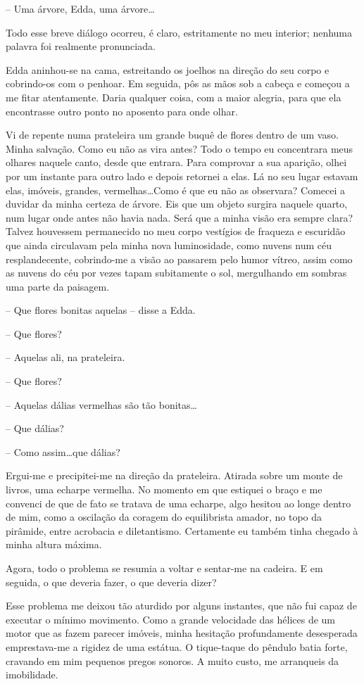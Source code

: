 -- Uma árvore, Edda, uma árvore\dots

Todo esse breve diálogo ocorreu, é claro, estritamente no meu interior; nenhuma palavra foi realmente pronunciada.

Edda aninhou-se na cama, estreitando os joelhos na direção do seu corpo e cobrindo-os com o penhoar. Em seguida, pôs as mãos sob a cabeça e começou a me fitar atentamente. Daria qualquer coisa, com a maior alegria, para que ela encontrasse outro ponto no aposento para onde olhar.

Vi de repente numa prateleira um grande buquê de flores dentro de um vaso. Minha salvação.
Como eu não as vira antes? Todo o tempo eu concentrara meus olhares naquele canto, desde que entrara. Para comprovar a sua aparição, olhei por um instante para outro lado e depois retornei a elas. Lá no seu lugar estavam elas, imóveis, grandes, vermelhas\dots Como é que eu não as observara? Comecei a duvidar da minha certeza de árvore. Eis que um objeto surgira naquele quarto, num lugar onde antes não havia nada. Será que a minha visão era sempre clara? Talvez houvessem permanecido no meu corpo vestígios de fraqueza e escuridão que ainda circulavam pela minha nova luminosidade, como nuvens num céu resplandecente, cobrindo-me a visão ao passarem pelo humor vítreo, assim como as nuvens do céu por vezes tapam subitamente o sol, mergulhando em sombras uma parte da paisagem.

-- Que flores bonitas aquelas -- disse a Edda.

-- Que flores?

-- Aquelas ali, na prateleira.

-- Que flores?

-- Aquelas dálias vermelhas são tão bonitas\dots

-- Que dálias?

-- Como assim\dots que dálias?

Ergui-me e precipitei-me na direção da prateleira. Atirada sobre um monte de livros, uma echarpe vermelha. No momento em que estiquei o braço e me convenci de que de fato se tratava de uma echarpe, algo hesitou ao longe dentro de mim, como a oscilação da coragem do equilibrista amador, no topo da pirâmide, entre acrobacia e diletantismo. Certamente eu também tinha chegado à minha altura máxima.

Agora, todo o problema se resumia a voltar e sentar-me na cadeira. E em seguida, o que deveria fazer, o que deveria dizer?

Esse problema me deixou tão aturdido por alguns instantes, que não fui capaz de executar o mínimo movimento. Como a grande velocidade das hélices de um motor que as fazem parecer imóveis, minha hesitação profundamente desesperada emprestava-me a rigidez de uma estátua. O tique-taque do pêndulo batia forte, cravando em mim pequenos pregos sonoros. A muito custo, me arranqueis da imobilidade. 


